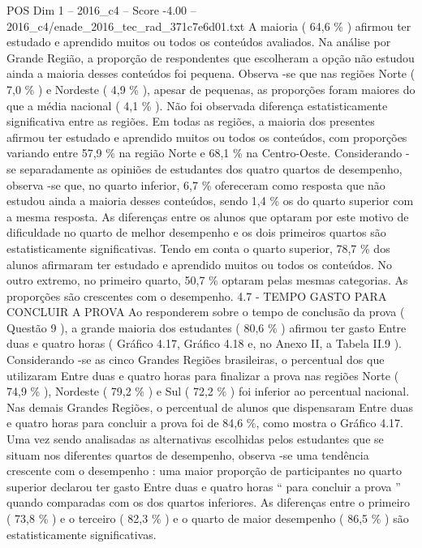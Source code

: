 \begin{textsample}{POS Dim 1 – 2016\_c4 – Score -4.00 – 2016\_c4/enade\_2016\_tec\_rad\_371c7e6d01.txt}
A maioria ( 64,6 \% ) afirmou ter estudado e aprendido muitos ou todos os conteúdos avaliados.
Na análise por Grande Região, a proporção de respondentes que escolheram a opção não estudou ainda a maioria desses conteúdos foi pequena.
Observa -se que nas regiões Norte ( 7,0 \% ) e Nordeste ( 4,9 \% ), apesar de pequenas, as proporções foram maiores do que a média nacional ( 4,1 \% ).
Não foi observada diferença estatisticamente significativa entre as regiões.
Em todas as regiões, a maioria dos presentes afirmou ter estudado e aprendido muitos ou todos os conteúdos, com proporções variando entre 57,9 \% na região Norte e 68,1 \% na Centro-Oeste.
Considerando -se separadamente as opiniões de estudantes dos quatro quartos de desempenho, observa -se que, no quarto inferior, 6,7 \% ofereceram como resposta que não estudou ainda a maioria desses conteúdos, sendo 1,4 \% os do quarto superior com a mesma resposta.
As diferenças entre os alunos que optaram por este motivo de dificuldade no quarto de melhor desempenho e os dois primeiros quartos são estatisticamente significativas.
Tendo em conta o quarto superior, 78,7 \% dos alunos afirmaram ter estudado e aprendido muitos ou todos os conteúdos.
No outro extremo, no primeiro quarto, 50,7 \% optaram pelas mesmas categorias.
As proporções são crescentes com o desempenho. 4.7 - TEMPO GASTO PARA CONCLUIR A PROVA Ao responderem sobre o tempo de conclusão da prova ( Questão 9 ), a grande maioria dos estudantes ( 80,6 \% ) afirmou ter gasto Entre duas e quatro horas ( Gráfico 4.17, Gráfico 4.18 e, no Anexo II, a Tabela II.9 ).
Considerando -se as cinco Grandes Regiões brasileiras, o percentual dos que utilizaram Entre duas e quatro horas para finalizar a prova nas regiões Norte ( 74,9 \% ), Nordeste ( 79,2 \% ) e Sul ( 72,2 \% ) foi inferior ao percentual nacional.
Nas demais Grandes Regiões, o percentual de alunos que dispensaram Entre duas e quatro horas para concluir a prova foi de 84,6 \%, como mostra o Gráfico 4.17.
Uma vez sendo analisadas as alternativas escolhidas pelos estudantes que se situam nos diferentes quartos de desempenho, observa -se uma tendência crescente com o desempenho : uma maior proporção de participantes no quarto superior declarou ter gasto Entre duas e quatro horas “ para concluir a prova ” quando comparadas com os dos quartos inferiores.
As diferenças entre o primeiro ( 73,8 \% ) e o terceiro ( 82,3 \% ) e o quarto de maior desempenho ( 86,5 \% ) são estatisticamente significativas.

\end{textsample}
